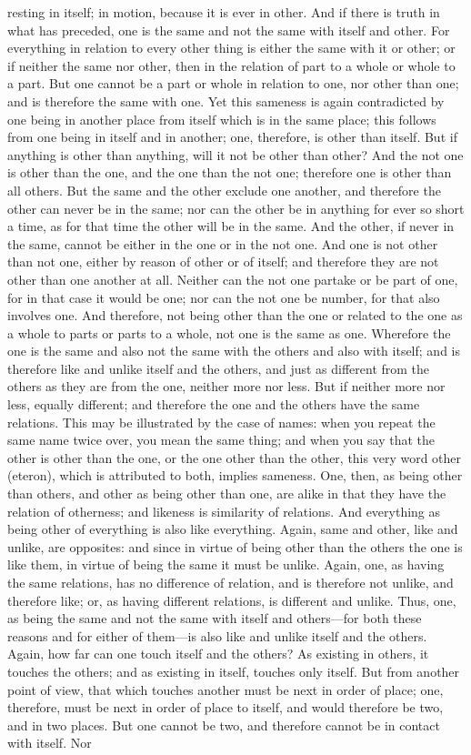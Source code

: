 \documentclass[11pt,letter]{article}
\begin{document}
resting in itself; in motion, because it is ever in other. And if there is truth in what has preceded, one is the same and not the same with itself and other. For everything in relation to every other thing is either the same with it or other; or if neither the same nor other, then in the relation of part to a whole or whole to a part. But one cannot be a part or whole in relation to one, nor other than one; and is therefore the same with one. Yet this sameness is again contradicted by one being in another place from itself which is in the same place; this follows from one being in itself and in another; one, therefore, is other than itself. But if anything is other than anything, will it not be other than other? And the not one is other than the one, and the one than the not one; therefore one is other than all others. But the same and the other exclude one another, and therefore the other can never be in the same; nor can the other be in anything for ever so short a time, as for that time the other will be in the same. And the other, if never in the same, cannot be either in the one or in the not one. And one is not other than not one, either by reason of other or of itself; and therefore they are not other than one another at all. Neither can the not one partake or be part of one, for in that case it would be one; nor can the not one be number, for that also involves one. And therefore, not being other than the one or related to the one as a whole to parts or parts to a whole, not one is the same as one. Wherefore the one is the same and also not the same with the others and also with itself; and is therefore like and unlike itself and the others, and just as different from the others as they are from the one, neither more nor less. But if neither more nor less, equally different; and therefore the one and the others have the same relations. This may be illustrated by the case of names: when you repeat the same name twice over, you mean the same thing; and when you say that the other is other than the one, or the one other than the other, this very word other (eteron), which is attributed to both, implies sameness. One, then, as being other than others, and other as being other than one, are alike in that they have the relation of otherness; and likeness is similarity of relations. And everything as being other of everything is also like everything. Again, same and other, like and unlike, are opposites: and since in virtue of being other than the others the one is like them, in virtue of being the same it must be unlike. Again, one, as having the same relations, has no difference of relation, and is therefore not unlike, and therefore like; or, as having different relations, is different and unlike. Thus, one, as being the same and not the same with itself and others—for both these reasons and for either of them—is also like and unlike itself and the others. Again, how far can one touch itself and the others? As existing in others, it touches the others; and as existing in itself, touches only itself. But from another point of view, that which touches another must be next in order of place; one, therefore, must be next in order of place to itself, and would therefore be two, and in two places. But one cannot be two, and therefore cannot be in contact with itself. Nor 
\end{document}

